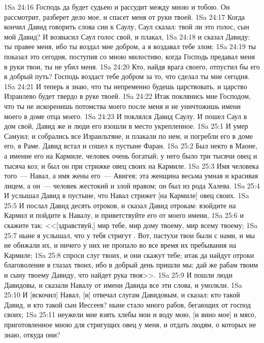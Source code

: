 \vs 1Sa 24:16 Господь да будет судьею и рассудит между мною и тобою. Он рассмотрит, разберет дело мое, и спасет меня от руки твоей.
\vs 1Sa 24:17 Когда кончил Давид говорить слова сии к Саулу, Саул сказал: твой ли это голос, сын мой Давид? И возвысил Саул голос свой, и плакал,
\vs 1Sa 24:18 и сказал Давиду: ты правее меня, ибо ты воздал мне добром, а я воздавал тебе злом;
\vs 1Sa 24:19 ты показал это сегодня, поступив со мною милостиво, когда Господь предавал меня в руки твои, ты не убил меня.
\vs 1Sa 24:20 Кто, найдя врага своего, отпустил бы его в добрый путь? Господь воздаст тебе добром за то, что сделал ты мне сегодня.
\vs 1Sa 24:21 И теперь я знаю, что ты непременно будешь царствовать, и царство Израилево будет твердо в руке твоей.
\vs 1Sa 24:22 Итак поклянись мне Господом, что ты не искоренишь потомства моего после меня и не уничтожишь имени моего в доме отца моего.
\vs 1Sa 24:23 И поклялся Давид Саулу. И пошел Саул в дом свой, Давид же и люди его взошли в место укрепленное.
\vs 1Sa 25:1 И умер Самуил; и собрались все Израильтяне, и плакали по нем, и погребли его в доме его, в Раме. Давид встал и сошел к пустыне Фаран.
\rsbpar\vs 1Sa 25:2 Был некто в Маоне, а имение его на Кармиле, человек очень богатый; у него было три тысячи овец и тысяча коз; и был он при стрижке овец своих на Кармиле.
\vs 1Sa 25:3 Имя человека того~--- Навал, а имя жены его~--- Авигея; эта женщина  весьма умная и красивая лицем, а он~--- человек жестокий и злой нравом; он был из рода Халева.
\vs 1Sa 25:4 И услышал Давид в пустыне, что Навал стрижет [на Кармиле] овец своих.
\vs 1Sa 25:5 И послал Давид десять отроков, и сказал Давид отрокам: взойдите на Кармил и пойдите к Навалу, и приветствуйте его от моего имени,
\vs 1Sa 25:6 и скажите так: <<[здравствуй,] мир тебе, мир дому твоему, мир всему твоему;
\vs 1Sa 25:7 ныне я услышал, что у тебя стригут . Вот, пастухи твои были с нами, и мы не обижали их, и ничего у них не пропало во все время их пребывания на Кармиле;
\vs 1Sa 25:8 спроси слуг твоих, и они скажут тебе; итак да найдут отроки благоволение в глазах твоих, ибо в добрый день пришли мы; дай же рабам твоим и сыну твоему Давиду, что найдет рука твоя>>.
\vs 1Sa 25:9 И пошли люди Давидовы, и сказали Навалу от имени Давида все эти слова, и умолкли.
\vs 1Sa 25:10 И [вскочил] Навал, [и] отвечал слугам Давидовым, и сказал: кто такой Давид, и кто такой сын Иессеев? ныне стало много рабов, бегающих от господ своих;
\vs 1Sa 25:11 неужели мне взять хлебы мои и воду мою, [и вино мое] и мясо, приготовленное мною для стригущих овец у меня, и отдать людям, о которых не знаю, откуда они?
